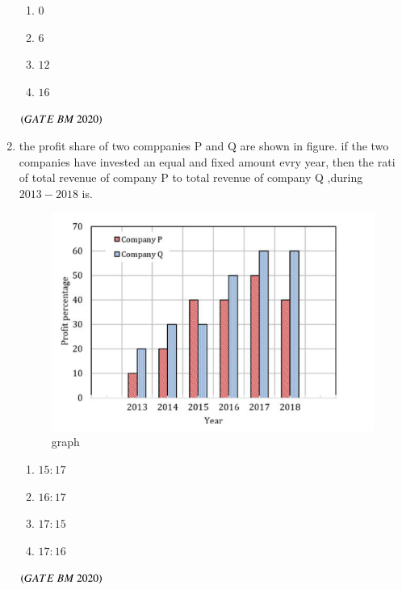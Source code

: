 \documentclass[journal,12pt,onecolumn]{IEEEtran}
\theoremstyle{remark}
\begin{document}
\begin{enumerate}
\begin{enumerate}
\item\hspace{0.5cm}$0$
\item\hspace{0.5cm}$6$
\item\hspace{0.5cm}$12$
\item\hspace{0.5cm}$16$\\
\end{enumerate}
\hfill $\left(GATE\ BM\ 2020\right)$

\item the profit share of two comppanies P and Q are shown in figure. if the two companies have invested an equal and fixed amount evry year, then the rati of total revenue of company P to total revenue of company Q ,during $2013-2018$ is\underline{\hspace{2cm}}.
\begin{figure}[H]
\centering
\includegraphics[width=0.4\columnwidth]{Figs/fig1.png}

\caption{graph}
\label{fig:placeholder}
\end{figure}
\begin{enumerate}
\item\hspace{0.5cm}$15:17$
\item\hspace{0.5cm}$16:17$
\item\hspace{0.5cm}$17:15$
\item\hspace{0.5cm}$17:16$\\
 \end{enumerate}
 \hfill $\left(GATE\ BM\ 2020\right)$
 \end{enumerate}
 
\end{document}
